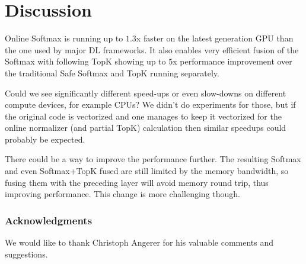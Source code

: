 \documentclass{article}
\begin{document}
\section{Discussion}

Online Softmax is running up to $1.3$x faster on the latest generation GPU than the one used by major DL frameworks. It also enables very efficient fusion of the Softmax with following TopK showing up to $5$x performance improvement over the traditional Safe Softmax and TopK running separately.

Could we see significantly different speed-ups or even slow-downs on different compute devices, for example CPUs? We didn't do experiments for those, but if the original code is vectorized and one manages to keep it vectorized for the online normalizer (and partial TopK) calculation then similar speedups could probably be expected.

There could be a way to improve the performance further. The resulting Softmax and even Softmax+TopK fused are still limited by the memory bandwidth, so fusing them with the preceding layer will avoid memory round trip, thus improving performance. This change is more challenging though.

\subsubsection*{Acknowledgments}

We would like to thank Christoph Angerer for his valuable comments and suggestions.



\end{document}
